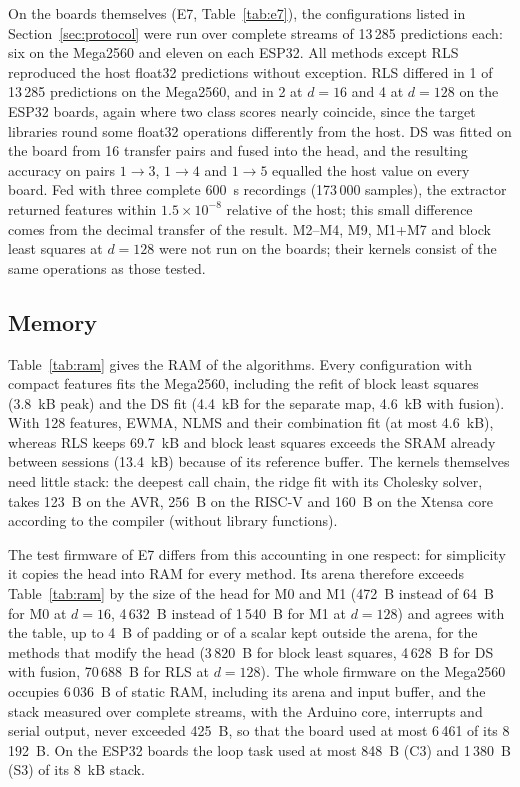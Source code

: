 \documentclass[journal,twoside,web]{ieeecolor}
\begin{document}
On the boards themselves (E7, Table~\ref{tab:e7}), the configurations listed in Section~\ref{sec:protocol} were run over complete streams of 13\,285 predictions each: six on the Mega2560 and eleven on each ESP32. All methods except RLS reproduced the host float32 predictions without exception. RLS differed in 1 of 13\,285 predictions on the Mega2560, and in 2 at $d=16$ and 4 at $d=128$ on the ESP32 boards, again where two class scores nearly coincide, since the target libraries round some float32 operations differently from the host. DS was fitted on the board from 16 transfer pairs and fused into the head, and the resulting accuracy on pairs $1\rightarrow3$, $1\rightarrow4$ and $1\rightarrow5$ equalled the host value on every board. Fed with three complete 600~s recordings (173\,000 samples), the extractor returned features within $1.5\times10^{-8}$ relative of the host; this small difference comes from the decimal transfer of the result. M2--M4, M9, M1+M7 and block least squares at $d=128$ were not run on the boards; their kernels consist of the same operations as those tested.




\subsection{Memory}
\label{sec:memory}
Table~\ref{tab:ram} gives the RAM of the algorithms. Every configuration with compact features fits the Mega2560, including the refit of block least squares (3.8~kB peak) and the DS fit (4.4~kB for the separate map, 4.6~kB with fusion). With 128 features, EWMA, NLMS and their combination fit (at most 4.6~kB), whereas RLS keeps 69.7~kB and block least squares exceeds the SRAM already between sessions (13.4~kB) because of its reference buffer. The kernels themselves need little stack: the deepest call chain, the ridge fit with its Cholesky solver, takes 123~B on the AVR, 256~B on the RISC-V and 160~B on the Xtensa core according to the compiler (without library functions).

The test firmware of E7 differs from this accounting in one respect: for simplicity it copies the head into RAM for every method. Its arena therefore exceeds Table~\ref{tab:ram} by the size of the head for M0 and M1 (472~B instead of 64~B for M0 at $d=16$, 4\,632~B instead of 1\,540~B for M1 at $d=128$) and agrees with the table, up to 4~B of padding or of a scalar kept outside the arena, for the methods that modify the head (3\,820~B for block least squares, 4\,628~B for DS with fusion, 70\,688~B for RLS at $d=128$). The whole firmware on the Mega2560 occupies 6\,036~B of static RAM, including its arena and input buffer, and the stack measured over complete streams, with the Arduino core, interrupts and serial output, never exceeded 425~B, so that the board used at most 6\,461 of its 8\,192~B. On the ESP32 boards the loop task used at most 848~B (C3) and 1\,380~B (S3) of its 8~kB stack.
\end{document}

